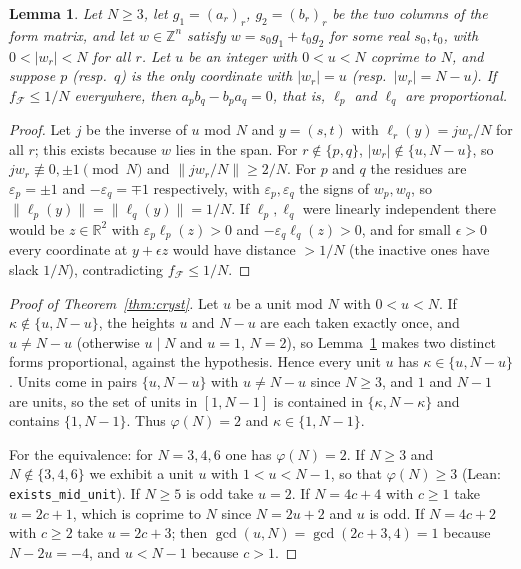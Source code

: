 \documentclass[11pt]{amsart}
\newtheorem{lemma}[theorem]{Lemma}
\theoremstyle{definition}
\theoremstyle{remark}
\newcommand{\R}{\mathbb{R}}
\newcommand{\Z}{\mathbb{Z}}
\newcommand{\dist}[1]{\lVert #1\rVert}
\newcommand{\lean}[1]{\texttt{#1}}
\begin{document}
\begin{lemma}\label{lem:pair}
Let $N\ge3$, let $g_1=(a_r)_r$, $g_2=(b_r)_r$ be the two columns of the form matrix, and let $w\in\Z^n$ satisfy $w=s_0g_1+t_0g_2$ for some real $s_0,t_0$, with $0<|w_r|<N$ for all $r$. Let $u$ be an integer with $0<u<N$ coprime to $N$, and suppose $p$ (resp.\ $q$) is the only coordinate with $|w_r|=u$ (resp.\ $|w_r|=N-u$). If $f_{\mathcal F}\le1/N$ everywhere, then $a_pb_q-b_pa_q=0$, that is, $\ell_p$ and $\ell_q$ are proportional.
\end{lemma}
\begin{proof}
Let $j$ be the inverse of $u$ mod $N$ and $y=(s,t)$ with $\ell_r(y)=jw_r/N$ for all $r$; this exists because $w$ lies in the span. For $r\notin\{p,q\}$, $|w_r|\notin\{u,N-u\}$, so $jw_r\not\equiv0,\pm1\pmod N$ and $\dist{jw_r/N}\ge2/N$. For $p$ and $q$ the residues are $\varepsilon_p=\pm1$ and $-\varepsilon_q=\mp1$ respectively, with $\varepsilon_p,\varepsilon_q$ the signs of $w_p,w_q$, so $\dist{\ell_p(y)}=\dist{\ell_q(y)}=1/N$. If $\ell_p,\ell_q$ were linearly independent there would be $z\in\R^2$ with $\varepsilon_p\ell_p(z)>0$ and $-\varepsilon_q\ell_q(z)>0$, and for small $\epsilon>0$ every coordinate at $y+\epsilon z$ would have distance $>1/N$ (the inactive ones have slack $1/N$), contradicting $f_{\mathcal F}\le1/N$.
\end{proof}

\begin{proof}[Proof of Theorem~\ref{thm:cryst}]
Let $u$ be a unit mod $N$ with $0<u<N$. If $\kappa\notin\{u,N-u\}$, the heights $u$ and $N-u$ are each taken exactly once, and $u\ne N-u$ (otherwise $u\mid N$ and $u=1$, $N=2$), so Lemma~\ref{lem:pair} makes two distinct forms proportional, against the hypothesis. Hence every unit $u$ has $\kappa\in\{u,N-u\}$. Units come in pairs $\{u,N-u\}$ with $u\ne N-u$ since $N\ge3$, and $1$ and $N-1$ are units, so the set of units in $[1,N-1]$ is contained in $\{\kappa,N-\kappa\}$ and contains $\{1,N-1\}$. Thus $\varphi(N)=2$ and $\kappa\in\{1,N-1\}$.

For the equivalence: for $N=3,4,6$ one has $\varphi(N)=2$. If $N\ge3$ and $N\notin\{3,4,6\}$ we exhibit a unit $u$ with $1<u<N-1$, so that $\varphi(N)\ge3$ (Lean: \lean{exists\_mid\_unit}). If $N\ge5$ is odd take $u=2$. If $N=4c+4$ with $c\ge1$ take $u=2c+1$, which is coprime to $N$ since $N=2u+2$ and $u$ is odd. If $N=4c+2$ with $c\ge2$ take $u=2c+3$; then $\gcd(u,N)=\gcd(2c+3,4)=1$ because $N-2u=-4$, and $u<N-1$ because $c>1$.
\end{proof}
\end{document}
